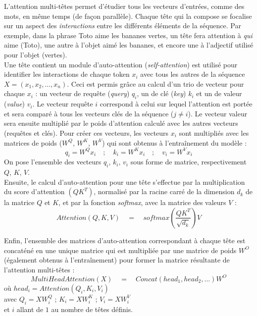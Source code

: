 \documentclass[12pt, twoside]{report}
\begin{document}
L'attention multi-têtes permet d'étudier tous les vecteurs d'entrées, comme des mots, en même temps (de façon parallèle). Chaque tête qui la compose se focalise sur un aspect des \textit{interactions} entre les différents éléments de la séquence. Par exemple, dans la phrase \og Toto aime les bananes vertes\fg{}, un tête fera attention à \textit{qui} aime (\og Toto\fg{}), une autre à l'objet aimé \og les bananes\fg{}, et encore une à l'adjectif utilisé pour l'objet (\og vertes\fg{}).\\ 

Une tête contient un module d'auto-attention (\textit{self-attention}) est utilisé pour identifier les interactions de chaque \gls{token} $x_i$ avec tous les autres de la séquence $X=(x_1, x_2, \dots, x_n)$. Ceci est permis grâce au calcul d'un trio de vecteur pour chaque $x_i$ : un vecteur de requête (\textit{query}) $q_i$, un de clé (\textit{key}) $k_i$ et un de valeur (\textit{value}) $v_i$. Le vecteur requête $i$ correspond à celui sur lequel l'attention est portée et sera comparé à tous les vecteurs clés de la séquence ($j\ne i$). Le vecteur valeur sera ensuite multiplié par le poids d'attention calculé avec les autres vecteurs (requêtes et clés). Pour créer ces vecteurs, les vecteurs $x_i$ sont multipliés avec les matrices de poids ($W^Q$, $W^K$, $W^V$) qui sont obtenus à l'entraînement du modèle :
\begin{equation}
    q_i = W^Q x_i \quad ; \quad k_i = W^K x_i \quad ; \quad v_i = W^V x_i
\end{equation}
On pose l'ensemble des vecteurs $q_i$, $k_i$, $v_i$ sous forme de matrice, respectivement $Q$, $K$, $V$.\\

Ensuite, le calcul d'auto-attention pour une tête s'effectue par la multiplication du score d'attention $(QK^T)$, normalisé par la racine carré de la dimension $d_k$ de la matrice $Q$ et $K$, et par la fonction \textit{softmax}, avec la matrice des valeurs $V$ :
\begin{equation}
    Attention(Q, K, V) \quad  = \quad  softmax(\frac{QK^T}{\sqrt{d_k}})V
\end{equation}

Enfin, l'ensemble des matrices d'auto-attention correspondant à chaque tête est concaténé en une unique matrice qui est multipliée par une matrice de poids $W^O$ (également obtenus à l'entraînement) pour former la matrice résultante de l'attention multi-têtes :
\begin{equation}
    MultiHeadAttention(X) \quad = \quad Concat(head_1, head_2, ...)W^O
\end{equation}
\hfill où $head_i = Attention(Q_i, K_i, V_i)$\\
\vspace{2pt}
\hfill avec $Q_i = XW^Q_i$ ; $K_i = XW^K_i$ ; $V_i = XW^V_i$\\
\vspace{2pt}
\hfill et $i$ allant de $1$ au nombre de têtes définis.\\
\end{document}
